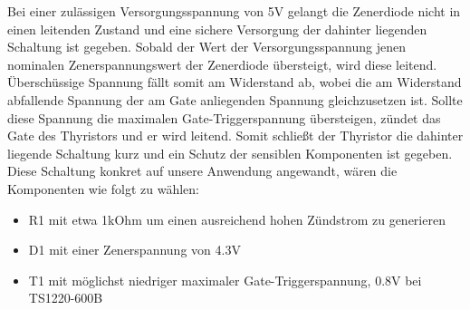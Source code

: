 Bei einer zulässigen Versorgungsspannung von 5V gelangt die Zenerdiode nicht in einen leitenden Zustand und eine sichere Versorgung der dahinter liegenden Schaltung ist gegeben.
Sobald der Wert der Versorgungsspannung jenen nominalen Zenerspannungswert der Zenerdiode übersteigt, wird diese leitend.
Überschüssige Spannung fällt somit am Widerstand ab, wobei die am Widerstand abfallende Spannung der am Gate anliegenden Spannung gleichzusetzen ist.
Sollte diese Spannung die maximalen Gate-Triggerspannung übersteigen, zündet das Gate des Thyristors und er wird leitend.
Somit schließt der Thyristor die dahinter liegende Schaltung kurz und ein Schutz der sensiblen Komponenten ist gegeben. \\

Diese Schaltung konkret auf unsere Anwendung angewandt, wären die Komponenten wie folgt zu wählen:
\begin{itemize}
    \item R1 mit etwa 1kOhm um einen ausreichend hohen Zündstrom zu generieren
    \item D1 mit einer Zenerspannung von 4.3V
    \item T1 mit möglichst niedriger maximaler Gate-Triggerspannung, 0.8V bei TS1220-600B
\end{itemize}

